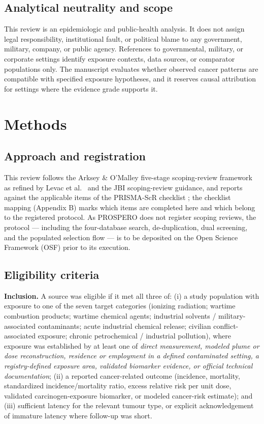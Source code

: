 \documentclass[3p,times]{elsarticle}
\begin{document}
\subsection{Analytical neutrality and scope}
This review is an epidemiologic and public-health analysis. It does not assign legal responsibility, institutional fault, or political blame to any government, military, company, or public agency. References to governmental, military, or corporate settings identify exposure contexts, data sources, or comparator populations only. The manuscript evaluates whether observed cancer patterns are compatible with specified exposure hypotheses, and it reserves causal attribution for settings where the evidence grade supports it.

\section{Methods}

\subsection{Approach and registration}
This review follows the Arksey \& O'Malley \citep{arksey2005} five-stage scoping-review framework as refined by Levac et al.\ \citep{levac2010} and the JBI scoping-review guidance, and reports against the applicable items of the PRISMA-ScR checklist \citep{tricco2018}; the checklist mapping (Appendix B) marks which items are completed here and which belong to the registered protocol. As PROSPERO does not register scoping reviews, the protocol --- including the four-database search, de-duplication, dual screening, and the populated selection flow --- is to be deposited on the Open Science Framework (OSF) prior to its execution.

\subsection{Eligibility criteria}
\textbf{Inclusion.} A source was eligible if it met all three of: (i) a study population with exposure to one of the seven target categories (ionizing radiation; wartime combustion products; wartime chemical agents; industrial solvents / military-associated contaminants; acute industrial chemical release; civilian conflict-associated exposure; chronic petrochemical / industrial pollution), where exposure was established by at least one of \emph{direct measurement, modeled plume or dose reconstruction, residence or employment in a defined contaminated setting, a registry-defined exposure area, validated biomarker evidence, or official technical documentation}; (ii) a reported cancer-related outcome (incidence, mortality, standardized incidence/mortality ratio, excess relative risk per unit dose, validated carcinogen-exposure biomarker, or modeled cancer-risk estimate); and (iii) sufficient latency for the relevant tumour type, or explicit acknowledgement of immature latency where follow-up was short.
\end{document}
